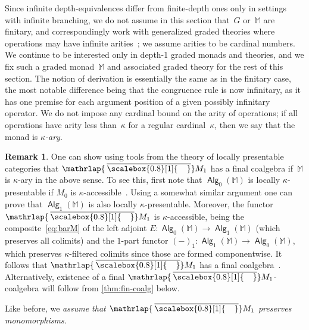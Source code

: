\documentclass[sigconf,
			final%
			nonacm
                        ]{acmart}
\numberwithin{equation}{section}
\numberwithin{equation}{section}
\theoremstyle{plain}
\theoremstyle{definition}
\newtheorem{rem}[thm]{Remark}
\newcommand{\mybar}[3]{%
  \mathrlap{\hspace{#2}\overline{\scalebox{#1}[1]{\hphantom{\ensuremath{#3}}\vphantom{\rule{0pt}{5.5pt}}}}}\ensuremath{#3}
}
\newcommand{\barM}{\mybar{0.8}{2pt}{M}_1}
\newcommand{\M}{\mathbb{M}}                   %
\DeclareMathOperator{\Alg}{\mathsf{Alg}}
\begin{document}
Since infinite depth-equivalences differ from finite-depth ones only
in settings with infinite branching, we do not assume in this section
that~$G$ or~$\M$ are finitary, and correspondingly work with
generalized graded theories where operations may have infinite
arities~\cite{MPS15}; we assume arities to be cardinal numbers. We
continue to be interested only in depth-1 graded monads and theories,
and we fix such a graded monad~$\M$ and associated graded theory for the
rest of this section. The notion of derivation is essentially the same
as in the finitary case, the most notable difference being that the
congruence rule is now infinitary, as it has one premise for each
argument position of a given possibly infinitary operator. We do not
impose any cardinal bound on the arity of operations; if all
operations have arity less than~$\kappa$ for a regular
cardinal~$\kappa$, then we say that the monad is
\emph{$\kappa$-ary}.
%
\begin{rem}\label{R:final-coalg}
  One can show using tools from the theory of locally presentable
  categories that $\barM$ has a final coalgebra if~$\M$ is
  $\kappa$-ary in the above sense. To see this, first note that
  $\Alg_0(\M)$ is locally $\kappa$-presentable if $M_0$ is
  $\kappa$-accessible~\cite[Remark~2.78]{AR94}. Using a somewhat
  similar argument one can prove that $\Alg_1(\M)$ is also locally
  $\kappa$-presentable. Moreover, the functor $\barM$ is
  $\kappa$-accessible, being the composite~\eqref{eq:barM} of the left
  adjoint $E\colon \Alg_0(\M) \to \Alg_1(\M)$ (which preserves all
  colimits) and the $1$-part functor
  $(-)_1\colon \Alg_1(\M) \to \Alg_0(\M)$, which preserves
  $\kappa$-filtered colimits since those are formed componentwise.
  It follows that $\barM$ has a final
  coalgebra~\cite[Exercise~2j]{AR94}. Alternatively, existence of a
  final $\barM$-coalgebra will follow from \cref{thm:fin-coalg}
  below. %
\end{rem}

\noindent
Like before, we \emph{assume that $\barM$ preserves monomorphisms}.
\end{document}
